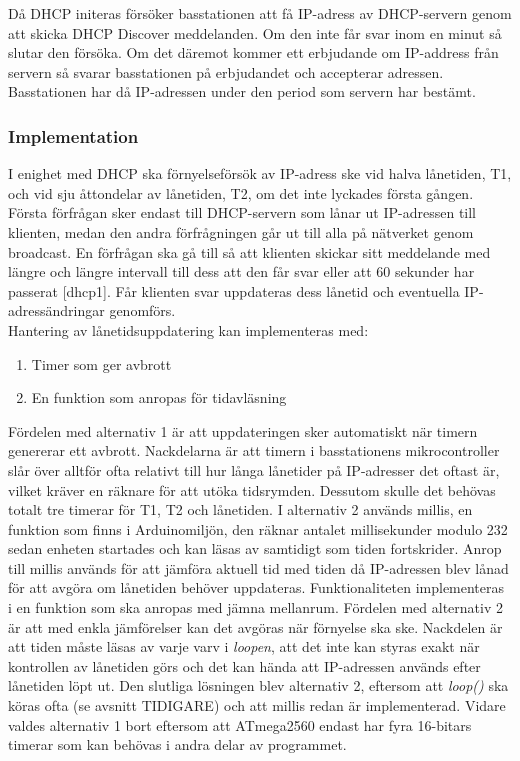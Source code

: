 \documentclass[a4paper,11pt]{article}
\begin{document}
Då DHCP initeras försöker basstationen att få IP-adress av DHCP-servern genom att skicka DHCP Discover meddelanden. Om den inte får svar inom en minut så slutar den försöka. Om det däremot kommer ett erbjudande om IP-address från servern så svarar basstationen på erbjudandet och accepterar adressen. Basstationen har då IP-adressen under den period som servern har bestämt.  

\subsubsection{Implementation}
I enighet med DHCP ska förnyelseförsök av IP-adress ske vid halva lånetiden, T1, och vid sju åttondelar av lånetiden, T2, om det inte lyckades första gången. Första förfrågan sker endast till DHCP-servern som lånar ut IP-adressen till klienten, medan den andra förfrågningen går ut till alla på nätverket genom broadcast. En förfrågan ska gå till så att klienten skickar sitt meddelande med längre och längre intervall till dess att den får svar eller att 60 sekunder har passerat [dhcp1]. Får klienten svar uppdateras dess lånetid och eventuella IP-adressändringar genomförs. \\

Hantering av lånetidsuppdatering kan implementeras med:

	\begin{enumerate}
	\item Timer som ger avbrott
    	\item En funktion som anropas för tidavläsning
	\end{enumerate}
	
Fördelen med alternativ 1 är att uppdateringen sker automatiskt när timern genererar ett avbrott. Nackdelarna är att timern i basstationens mikrocontroller slår över alltför ofta relativt till hur långa lånetider på IP-adresser det oftast är, vilket kräver en räknare för att utöka tidsrymden. Dessutom skulle det behövas totalt tre timerar för T1, T2 och lånetiden. I alternativ 2 används millis, en funktion som finns i Arduinomiljön, den räknar antalet millisekunder modulo 232 sedan enheten startades och kan läsas av samtidigt som tiden fortskrider. Anrop till millis används för att jämföra aktuell tid med tiden då IP-adressen blev lånad för att avgöra om lånetiden behöver uppdateras. Funktionaliteten implementeras i en funktion som ska anropas med jämna mellanrum. Fördelen med alternativ 2 är att med enkla jämförelser kan det avgöras när förnyelse ska ske. Nackdelen är att tiden måste läsas av varje varv i {\it loopen}, att det inte kan styras exakt när kontrollen av lånetiden görs och det kan hända att IP-adressen används efter lånetiden löpt ut. Den slutliga lösningen blev alternativ 2, eftersom att {\it loop()} ska köras ofta (se avsnitt TIDIGARE) och att millis redan är implementerad. Vidare valdes alternativ 1 bort eftersom att ATmega2560 endast har fyra 16-bitars timerar som kan behövas i andra delar av programmet. \\
\end{document}

